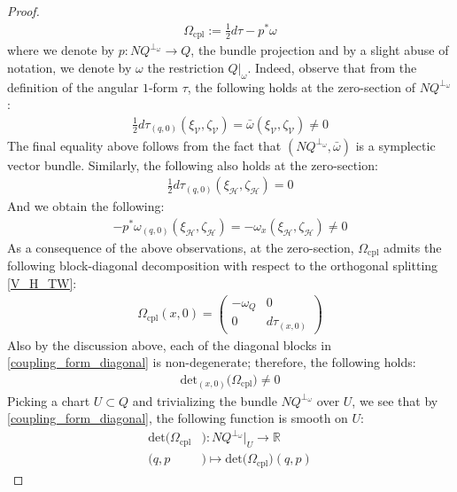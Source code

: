 \documentclass[11pt]{amsart}
\theoremstyle{plain}
\theoremstyle{definition}
\theoremstyle{remark}
\begin{document}
\begin{proof}
\begin{align}
    \Omega_{\text{cpl}}:=\frac{1}{2} d\tau-p^*\omega
\end{align}
where we denote by $p: NQ^{\perp_{\omega}} \rightarrow Q$, the bundle projection and by a slight abuse of notation, we denote by $\omega$ the restriction $Q\big|_{\omega}$. Indeed, observe that from the definition of the angular $1$-form $\tau$, the following holds at the zero-section of $NQ^{\perp_{\omega}}$:
\begin{align}
    \frac{1}{2}d\tau_{(q,0)}(\xi_\mathcal{V},\zeta_{\mathcal{V}}) = \bar \omega(\xi_\mathcal{V},\zeta_{\mathcal{V}}) \neq 0
\end{align}
The final equality above follows from the fact that $(NQ^{\perp_{\omega}},\bar \omega)$ is a symplectic vector bundle. Similarly, the following also holds at the zero-section:
\begin{align}
     \frac{1}{2}d\tau_{(q,0)}(\xi_\mathcal{H},\zeta_{\mathcal{H}}) = 0
\end{align}
And we obtain the following:
\begin{align}
    -p^*\omega_{(q,0)}(\xi_\mathcal{H},\zeta_{\mathcal{H}}) = -\omega_x(\xi_\mathcal{H},\zeta_{\mathcal{H}}) \neq 0
\end{align}
As a consequence of the above observations, at the zero-section, $\Omega_{\text{cpl}}$ admits the following block-diagonal decomposition with respect to the orthogonal splitting \eqref{V_H_TW}:
\begin{align}\label{coupling_form_diagonal}
    \Omega_{\text{cpl}}(x,0)= \begin{pmatrix}
        -\omega_Q &0 \\
        0& d\tau_{(x,0)}
    \end{pmatrix}
\end{align}
Also by the discussion above, each of the diagonal blocks in \eqref{coupling_form_diagonal} is non-degenerate; therefore, the following holds:
\begin{align}
    \text{det}_{(x,0)} \big(\Omega_{\text{cpl}}\big) \neq 0
\end{align}
Picking a chart $U\subset Q$ and trivializing the bundle $NQ^{\perp_{\omega}}$ over $U$, we see that by \eqref{coupling_form_diagonal}, the following function is smooth on $U$:
\begin{align}
 \text{det}\big(\Omega_{\text{cpl}}&\big): NQ^{\perp_{\omega}}\big\vert_{U} \rightarrow \mathbb{R}\\\nonumber 
 (q,p&) \mapsto \text{det}\big(\Omega_{\text{cpl}}\big)(q,p)

\end{align}
\end{proof}
\end{document}
